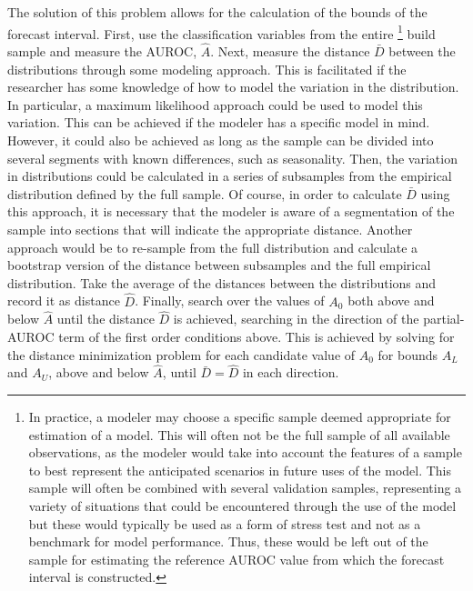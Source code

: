 The solution of this problem allows for the calculation of the bounds of the forecast interval.
First, use the classification variables from the entire
% 
\footnote{In practice, a modeler may choose a specific sample deemed appropriate for estimation of a model. This will often not be the full sample of all available observations, as the modeler would take into account the features of a sample to best represent the anticipated scenarios in future uses of the model. 
This sample will often be combined with several validation samples, representing a variety of situations that could be encountered through the use of the model but these would typically be used as a form of stress test and not as a benchmark for model performance. 
Thus, these would be left out of the sample for estimating the reference AUROC value from which the forecast interval is constructed. }
% 
build sample and measure the AUROC, $\hat{A}$.
%
Next, measure the distance $\bar{D}$ between the distributions
%
through some modeling approach.
%
This is facilitated if the researcher has some knowledge of how to model the variation in the distribution.
In particular, a maximum likelihood approach could be used to model this variation.
%
This can be achieved if the modeler has a specific model in mind.
%
However, it could also be achieved as long as the sample can be divided into several segments with known differences, such as seasonality.
%
Then, the variation in distributions could be calculated
in a series of subsamples from the empirical distribution defined by the full sample.
%
Of course, in order to calculate $\bar{D}$ using this approach,
%
it is necessary that the modeler is aware of a segmentation of the sample into sections that will indicate the appropriate distance.
%
Another approach would be to re-sample from the full distribution and calculate a bootstrap version of the distance between subsamples and the full empirical distribution.
%
Take the average of the distances between the distributions and record it as distance $\hat{D}$.
%
Finally, search over the values of $A_0$ both above and below $\hat{A}$ until the distance $\hat{D}$ is achieved, searching in the direction of the partial-AUROC term of the first order conditions above.
%
This is achieved by solving for the distance minimization problem for each candidate value of $A_0$ for bounds $A_L$ and $A_U$,
above and below $\hat{A}$, until $\bar{D} = \hat{D}$ in each direction.
%





